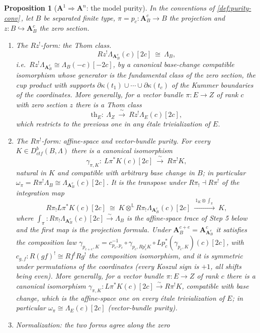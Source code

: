 \documentclass[11pt]{article}
\theoremstyle{plain}
\newtheorem{proposition}[theorem]{Proposition}
\theoremstyle{definition}
\newcommand{\Aaf}{\mathbf A}
\newcommand{\Cref}[1]{\hyperref[#1]{\ref{#1}}\,\hyperref[#1]{\nameref*{#1}}}
\begin{document}
\begin{proposition}[$\Aaf^1\Rightarrow\Aaf^n$: the model purity]
\label{prop:an}
In the conventions of \Cref{def:purity-conv}, let $B$ be separated finite
type, $\pi=p_c:\Aaf^c_B\to B$ the projection and $z:B\hookrightarrow\Aaf^c_B$
the zero section.
\begin{enumerate}
\item[(i)] \emph{The $Rz^{!}$-form: the Thom class.}
\[
Rz^{!}\Lambda_{\Aaf^c_B}(c)[2c]\ \cong\ \Lambda_B,
\]
i.e.\ $Rz^{!}\Lambda_{\Aaf^c_B}\cong\Lambda_B(-c)[-2c]$, by a canonical
base-change compatible isomorphism whose generator is the fundamental class
of the zero section, the cup product with supports
$\partial\kappa(t_1)\cup\cdots\cup\partial\kappa(t_c)$ of the Kummer
boundaries of the coordinates.  More generally, for a vector bundle
$\pi:E\to Z$ of rank $c$ with zero section $z$ there is a \emph{Thom class}
\[
\mathrm{th}_E:\ \Lambda_Z\ \xrightarrow{\ \sim\ }\ Rz^{!}\Lambda_E(c)[2c],
\]
which restricts to the previous one in any \'etale trivialization of $E$.
\item[(ii)] \emph{The $R\pi^{!}$-form: affine-space and vector-bundle
purity.}  For every $K\in D^b_{ctf}(B,\Lambda)$ there is a canonical
isomorphism
\[
\gamma_{\pi,K}:\ L\pi^{*}K(c)[2c]\ \xrightarrow{\ \sim\ }\ R\pi^{!}K,
\]
natural in $K$ and compatible with arbitrary base change in $B$; in
particular $\omega_\pi=R\pi^{!}\Lambda_B\cong\Lambda_{\Aaf^c_B}(c)[2c]$.
It is the transpose under $R\pi_!\dashv R\pi^{!}$ of the \emph{integration
map}
\[
R\pi_!L\pi^{*}K(c)[2c]\ \cong\ K\otimes^{\mathbb L}R\pi_!\Lambda_{\Aaf^c_B}(c)[2c]
\ \xrightarrow{\ 1_K\otimes\int_\pi\ }\ K,
\]
where $\int_\pi:R\pi_!\Lambda_{\Aaf^c_B}(c)[2c]\xrightarrow{\sim}\Lambda_B$ is
the affine-space trace of Step 5 below and the first map is the projection
formula.  Under $\Aaf^{c+e}_B=\Aaf^c_{\Aaf^e_B}$ it satisfies the composition
law
$\gamma_{p_{c+e},K}=c_{p_e,p_c}^{-1}\circ\gamma_{p_c,Rp_e^{!}K}\circ
Lp_c^{*}(\gamma_{p_e,K})(c)[2c]$, with $c_{g,f}:R(gf)^{!}\cong Rf^{!}Rg^{!}$
the composition isomorphism, and it is symmetric under permutations of the
coordinates (every Koszul sign is $+1$, all shifts being even).  More
generally, for a vector bundle $\pi:E\to Z$ of rank $c$ there is a canonical
isomorphism $\gamma_{\pi,K}:L\pi^{*}K(c)[2c]\xrightarrow{\sim}R\pi^{!}K$,
compatible with base change, which is the affine-space one on every \'etale
trivialization of $E$; in particular $\omega_\pi\cong\Lambda_E(c)[2c]$
(\emph{vector-bundle purity}).
\item[(iii)] \emph{Normalization: the two forms agree along the zero
}
\end{enumerate}
\end{proposition}
\end{document}
